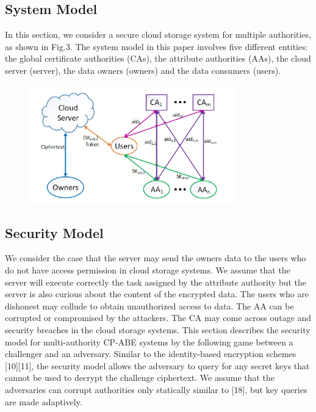 \documentclass[11pt,a4paper]{report}
\begin{document}
\subsection{System Model}
In this section, we consider a secure cloud storage system for multiple authorities, as shown
in Fig.3. The system model in this paper involves five different entities: the global certificate
authorities (CAs), the attribute authorities (AAs), the cloud server (server), the data owners
(owners) and the data consumers (users).

\begin{figure}
\centering
\includegraphics[width=0.8\textwidth]{fg.png}
\caption{\label{fig:3}}
\end{figure}

\subsection{Security Model}

We consider the case that the server may send the owners data to the users who do not
have access permission in cloud storage systems. We assume that the server will execute
correctly the task assigned by the attribute authority but the server is also curious about the
content of the encrypted data. The users who are dishonest may collude to obtain
unauthorized access to data. The AA can be corrupted or compromised by the attackers. The
CA may come across outage and security breaches in the cloud storage systems.
This section describes the security model for multi-authority CP-ABE systems by the
following game between a challenger and an adversary. Similar to the identity-based
encryption schemes [10][11], the security model allows the adversary to query for any secret
keys that cannot be used to decrypt the challenge ciphertext. We assume that the adversaries
can corrupt authorities only statically similar to [18], but key queries are made adaptively.
\end{document}
